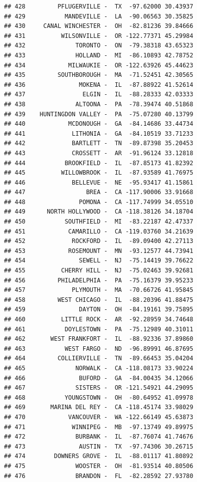 \documentclass{article}\usepackage[]{graphicx}\usepackage[]{color}
\makeatletter
\newenvironment{kframe}{%
 \def\at@end@of@kframe{}%
 \ifinner\ifhmode%
  \def\at@end@of@kframe{\end{minipage}}%
  \begin{minipage}{\columnwidth}%
 \fi\fi%
 \def\FrameCommand##1{\hskip\@totalleftmargin \hskip-\fboxsep
 \colorbox{shadecolor}{##1}\hskip-\fboxsep
     \hskip-\linewidth \hskip-\@totalleftmargin \hskip\columnwidth}%
 \MakeFramed {\advance\hsize-\width
   \@totalleftmargin\z@ \linewidth\hsize
   \@setminipage}}%
 {\par\unskip\endMakeFramed%
 \at@end@of@kframe}
\newenvironment{knitrout}{}{} %
\makeatother
\begin{document}
\begin{knitrout}
\begin{kframe}
\begin{verbatim}
## 428         PFLUGERVILLE -  TX  -97.62000 30.43937
## 429           MANDEVILLE -  LA  -90.06563 30.35825
## 430     CANAL WINCHESTER -  OH  -82.81236 39.84666
## 431          WILSONVILLE -  OR -122.77371 45.29984
## 432              TORONTO -  ON  -79.38318 43.65323
## 433              HOLLAND -  MI  -86.10893 42.78752
## 434            MILWAUKIE -  OR -122.63926 45.44623
## 435         SOUTHBOROUGH -  MA  -71.52451 42.30565
## 436               MOKENA -  IL  -87.88922 41.52614
## 437                ELGIN -  IL  -88.28333 42.03333
## 438              ALTOONA -  PA  -78.39474 40.51868
## 439    HUNTINGDON VALLEY -  PA  -75.07280 40.13799
## 440            MCDONOUGH -  GA  -84.14686 33.44734
## 441             LITHONIA -  GA  -84.10519 33.71233
## 442             BARTLETT -  TN  -89.87398 35.20453
## 443             CROSSETT -  AR  -91.96124 33.12818
## 444           BROOKFIELD -  IL  -87.85173 41.82392
## 445          WILLOWBROOK -  IL  -87.93589 41.76975
## 446             BELLEVUE -  NE  -95.93417 41.15861
## 447                 BREA -  CA -117.90006 33.91668
## 448               POMONA -  CA -117.74999 34.05510
## 449      NORTH HOLLYWOOD -  CA -118.38126 34.18704
## 450           SOUTHFIELD -  MI  -83.22187 42.47337
## 451            CAMARILLO -  CA -119.03760 34.21639
## 452             ROCKFORD -  IL  -89.09400 42.27113
## 453            ROSEMOUNT -  MN  -93.12577 44.73941
## 454               SEWELL -  NJ  -75.14419 39.76622
## 455          CHERRY HILL -  NJ  -75.02463 39.92681
## 456         PHILADELPHIA -  PA  -75.16379 39.95233
## 457             PLYMOUTH -  MA  -70.66726 41.95845
## 458         WEST CHICAGO -  IL  -88.20396 41.88475
## 459               DAYTON -  OH  -84.19161 39.75895
## 460          LITTLE ROCK -  AR  -92.28959 34.74648
## 461           DOYLESTOWN -  PA  -75.12989 40.31011
## 462       WEST FRANKFORT -  IL  -88.92336 37.89860
## 463           WEST FARGO -  ND  -96.89991 46.87695
## 464         COLLIERVILLE -  TN  -89.66453 35.04204
## 465              NORWALK -  CA -118.08173 33.90224
## 466               BUFORD -  GA  -84.00435 34.12066
## 467              SISTERS -  OR -121.54921 44.29095
## 468           YOUNGSTOWN -  OH  -80.64952 41.09978
## 469       MARINA DEL REY -  CA -118.45174 33.98029
## 470            VANCOUVER -  WA -122.66149 45.63873
## 471             WINNIPEG -  MB  -97.13749 49.89975
## 472              BURBANK -  IL  -87.76074 41.74676
## 473               AUSTIN -  TX  -97.74306 30.26715
## 474        DOWNERS GROVE -  IL  -88.01117 41.80892
## 475              WOOSTER -  OH  -81.93514 40.80506
## 476              BRANDON -  FL  -82.28592 27.93780

\end{verbatim}
\end{kframe}
\end{knitrout}
\end{document}
